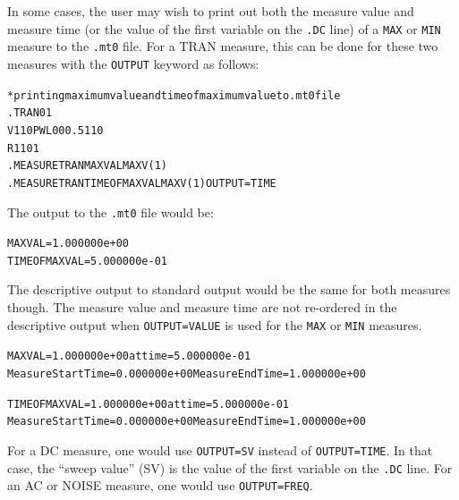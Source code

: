 In some cases, the user may wish to print out both the measure value
and measure time (or the value of the first variable on the {\tt .DC}
line) of a
\texttt{MAX} or \texttt{MIN} measure to the \texttt{.mt0} file.  For a TRAN measure,
this can be done for these two measures with the \texttt{OUTPUT}
keyword as follows:
\begin{alltt}
* printing maximum value and time of maximum value to .mt0 file
.TRAN 0 1
V1 1 0 PWL 0 0 0.5 1 1 0
R1 1 0 1
.MEASURE TRAN MAXVAL MAX V(1)
.MEASURE TRAN TIMEOFMAXVAL MAX V(1) OUTPUT=TIME
\end{alltt}
The output to the \texttt{.mt0} file would be:
\begin{alltt}
MAXVAL = 1.000000e+00
TIMEOFMAXVAL = 5.000000e-01
\end{alltt}
The descriptive output to standard output would be the same for both
measures though.  The measure value and measure time are not
re-ordered in the descriptive output when \texttt{OUTPUT=VALUE} is
used for the \texttt{MAX} or
\texttt{MIN} measures.
\begin{alltt}
MAXVAL = 1.000000e+00 at time = 5.000000e-01
Measure Start Time= 0.000000e+00        Measure End Time= 1.000000e+00

TIMEOFMAXVAL = 1.000000e+00 at time = 5.000000e-01
Measure Start Time= 0.000000e+00        Measure End Time= 1.000000e+00
\end{alltt}

For a DC measure, one would use \texttt{OUTPUT=SV} instead
of \texttt{OUTPUT=TIME}.  In that case, the ``sweep value'' (SV) is
the value of the first variable on the
\texttt{.DC} line. For an AC or NOISE measure, one would use \texttt{OUTPUT=FREQ}.


